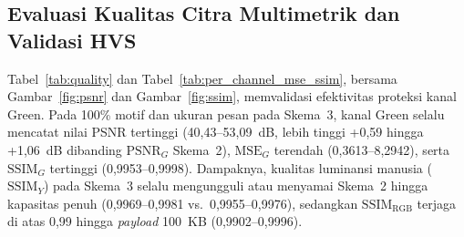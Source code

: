 \documentclass[12pt,journal]{IEEEtran}
\begin{document}
\subsection{Evaluasi Kualitas Citra Multimetrik dan Validasi HVS}
Tabel~\ref{tab:quality} dan Tabel~\ref{tab:per_channel_mse_ssim}, bersama Gambar~\ref{fig:psnr} dan Gambar~\ref{fig:ssim}, memvalidasi efektivitas proteksi kanal Green. Pada 100\% motif dan ukuran pesan pada Skema~3, kanal Green selalu mencatat nilai PSNR tertinggi (40,43--53,09~dB, lebih tinggi +0,59 hingga +1,06~dB dibanding $\text{PSNR}_G$ Skema~2), $\text{MSE}_G$ terendah (0,3613--8,2942), serta $\text{SSIM}_G$ tertinggi (0,9953--0,9998). Dampaknya, kualitas luminansi manusia ($\text{SSIM}_Y$) pada Skema~3 selalu mengungguli atau menyamai Skema~2 hingga kapasitas penuh (0,9969--0,9981 vs.\ 0,9955--0,9976), sedangkan $\text{SSIM}_{\text{RGB}}$ terjaga di atas 0,99 hingga \textit{payload} 100~KB (0,9902--0,9996).
\end{document}
